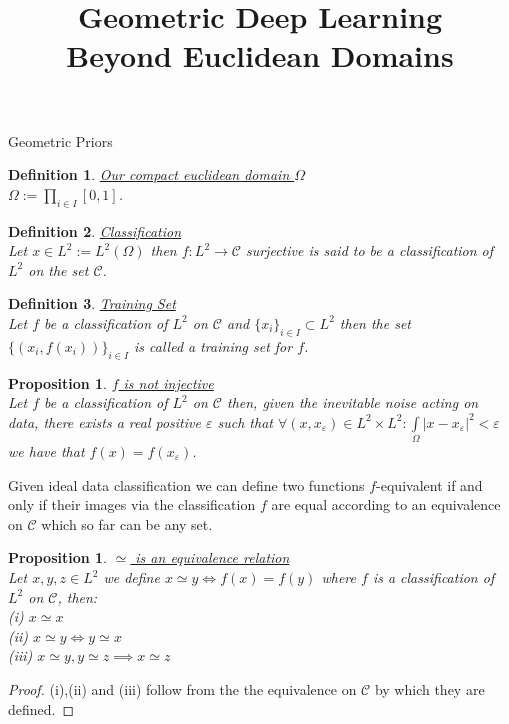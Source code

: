 \documentclass{article}
\title{Geometric Deep Learning \\ Beyond Euclidean Domains}
\author{}
\date{}
\newtheorem{prop}[thm]{Proposition}
\newtheorem{defn}{Definition}[section]
\newcommand{\eps}{\varepsilon}
\begin{document}
\maketitle
\begin{section}{Geometric Priors}

\begin{defn}\underline{Our compact euclidean domain $\Omega$}\\
$\Omega := \prod_{i \in I}[0,1]$.
\end{defn}

\begin{defn}\underline{Classification}\\
Let $x \in L^2 := L^2(\Omega)$ then $f : L^2 \to \mathcal{C}$ surjective
is said to be a classification of $L^2$ on the set $\mathcal{C}$.
\end{defn}

\begin{defn}\underline{Training Set}\\
Let $f$ be a classification of $L^2$ on $\mathcal{C}$ and $\{x_i\}_{i \in I}\subset L^2$
then the set $\{(x_i,f(x_i))\}_{i \in I}$ is called a training set for $f$.
\end{defn}

\begin{prop}\underline{$f$ is not injective}\\
Let $f$ be a classification of $L^2$ on $\mathcal{C}$ then, given the inevitable noise acting on data,
there exists a real positive $\eps$ such that $\forall (x,x_\eps) \in L^2\times L^2: \int\limits_\Omega{|x-x_\eps|^2}<\eps$
we have that $f(x)=f(x_\eps)$.
\end{prop}

Given ideal data classification we can define two functions $f$-equivalent if and only if 
their images via the classification $f$ are equal according to an equivalence on $\mathcal{C}$ which so far can be any set.

\begin{prop}\underline{$\simeq$ is an equivalence relation}\\
Let $x,y,z \in L^2$ we define $x\simeq y \iff f(x)=f(y)$ where $f$ is a classification of $L^2$ on $\mathcal{C}$,
then:\\
(i) $x \simeq x$\\
(ii) $x \simeq y \iff y \simeq x$\\
(iii) $x \simeq y, y \simeq z \implies x \simeq z$
\end{prop}
\begin{proof}
(i),(ii) and (iii) follow from the the equivalence on $\mathcal{C}$ by which they are defined.
\end{proof}



\end{section}
\end{document}
